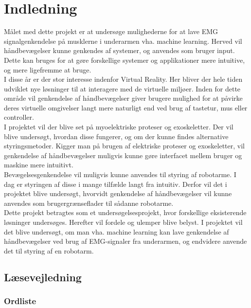 \thispagestyle{fancy}
\chapter{Indledning}
\label{chp:indledning}
Målet med dette projekt er at undersøge mulighederne for at lave EMG signalgenkendelse på musklerne i underarmen vha. machine learning. Herved vil håndbevægelser kunne genkendes af systemer, og anvendes som bruger input. Dette kan bruges for at gøre forskellige systemer og applikationer mere intuitive, og mere ligefremme at bruge.\\

I disse år er der stor interesse indenfor Virtual Reality. Her bliver der hele tiden udviklet nye løsninger til at interagere med de virtuelle miljøer. Inden for dette område vil genkendelse af håndbevægelser giver brugere mulighed for at påvirke deres virtuelle omgivelser langt mere naturligt end ved brug af tastetur, mus eller controller.\\

I projektet vil der blive set på myoelektriske proteser og exoskeletter. Der vil blive undersøgt, hvordan disse fungerer, og om der kunne findes alternative styringsmetoder.
Kigger man på brugen af elektriske proteser og exoskeletter, vil genkendelse af håndbevægelser muligvis kunne gøre interfacet mellem bruger og maskine mere intuitivt.\\

Bevægelsesgenkendelse vil muligvis kunne anvendes til styring af robotarme. I dag er styringen af disse i mange tilfælde langt fra intuitiv. Derfor vil det i projektet blive undersøgt, hvorvidt genkendelse af håndbevægelser vil kunne anvendes som brugergrænseflader til sådanne robotarme. \\

Dette projekt betragtes som et undersøgelsesprojekt, hvor forskellige eksisterende løsninger undersøges. Herefter vil fordele og ulemper blive belyst. I projektet vil det blive undersøgt, om man vha. machine learning kan lave genkendelse af håndbevægelser ved brug af EMG-signaler fra underarmen, og endvidere anvende det til styring af en robotarm.

\vfill

\section{Læsevejledning}
\subsection*{Ordliste}

